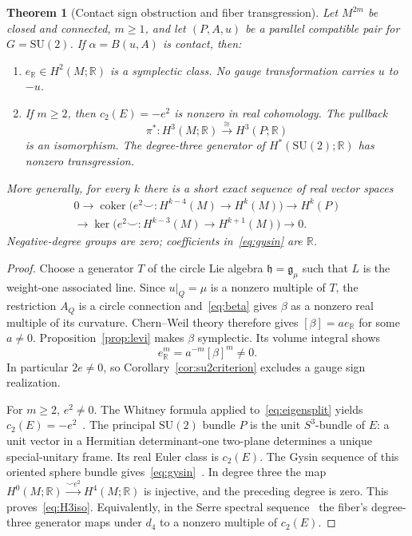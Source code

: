 \documentclass[11pt]{amsart}
\newcommand{\g}{\mathfrak g}
\newcommand{\h}{\mathfrak h}
\newcommand{\R}{\mathbb R}
\theoremstyle{plain}
\newtheorem{theorem}{Theorem}[section]
\theoremstyle{definition}
\theoremstyle{remark}
\begin{document}
\begin{theorem}[Contact sign obstruction and fiber transgression]\label{thm:contacttopology}
Let $M^{2m}$ be closed and connected, $m\ge1$, and let $(P,A,u)$ be a parallel compatible pair for $G=\mathrm{SU}(2)$.  If $\alpha=B(u,A)$ is contact, then:
\begin{enumerate}
\item $e_\R\in H^2(M;\R)$ is a symplectic class.  No gauge transformation carries $u$ to $-u$.
\item If $m\ge2$, then $c_2(E)=-e^2$ is nonzero in real cohomology.  The pullback
\begin{equation}\label{eq:H3iso}
 \pi^*:H^3(M;\R)\xrightarrow{\ \cong\ }H^3(P;\R)
\end{equation}
is an isomorphism.  The degree-three generator of $H^*(\mathrm{SU}(2);\R)$ has nonzero transgression.
\end{enumerate}
More generally, for every $k$ there is a short exact sequence of real vector spaces
\begin{equation}\label{eq:gysin}
\begin{gathered}
0\longrightarrow
 \operatorname{coker}\bigl(e^2\smile:H^{k-4}(M)\to H^k(M)\bigr)
 \longrightarrow H^k(P)\\
 \longrightarrow
 \ker\bigl(e^2\smile:H^{k-3}(M)\to H^{k+1}(M)\bigr)
 \longrightarrow0.
\end{gathered}
\end{equation}
Negative-degree groups are zero; coefficients in~\eqref{eq:gysin} are $\R$.
\end{theorem}

\begin{proof}
Choose a generator $T$ of the circle Lie algebra $\h=\g_\mu$ such that $L$ is the weight-one associated line.  Since $u|_Q=\mu$ is a nonzero multiple of $T$, the restriction $A_Q$ is a circle connection and~\eqref{eq:beta} gives $\beta$ as a nonzero real multiple of its curvature.  Chern--Weil theory therefore gives $[\beta]=a e_\R$ for some $a\ne0$.  Proposition~\ref{prop:levi} makes $\beta$ symplectic.  Its volume integral shows
\[
 e_\R^m=a^{-m}[\beta]^m\ne0.
\]
In particular $2e\ne0$, so Corollary~\ref{cor:su2criterion} excludes a gauge sign realization.

For $m\ge2$, $e^2\ne0$.  The Whitney formula applied to~\eqref{eq:eigensplit} yields $c_2(E)=-e^2$~\cite{MilnorStasheff}.  The principal $\mathrm{SU}(2)$ bundle $P$ is the unit $S^3$-bundle of $E$: a unit vector in a Hermitian determinant-one two-plane determines a unique special-unitary frame.  Its real Euler class is $c_2(E)$.  The Gysin sequence of this oriented sphere bundle gives~\eqref{eq:gysin}~\cite{BottTu}.  In degree three the map $H^0(M;\R)\xrightarrow{\smile e^2}H^4(M;\R)$ is injective, and the preceding degree is zero.  This proves~\eqref{eq:H3iso}.  Equivalently, in the Serre spectral sequence~\cite{Serre} the fiber's degree-three generator maps under $d_4$ to a nonzero multiple of $c_2(E)$.
\end{proof}
\end{document}
